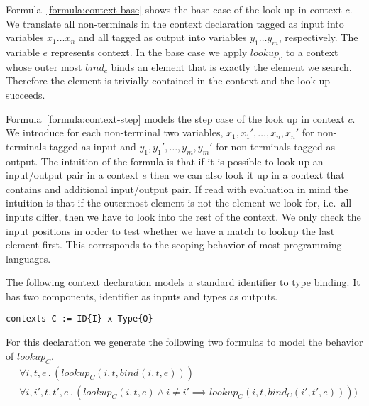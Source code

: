 Formula~\ref{formula:context-base} shows the base case of the look up
in context $c$. We translate all non-terminals in the context
declaration tagged as input into variables $x_1 \dots x_n$ and all
tagged as output into variables $y_1 \dots y_m$, respectively. The
variable $e$ represents context. In the base case we apply $lookup_c$
to a context whose outer most $bind_c$ binds an element that is
exactly the element we search. Therefore the element is trivially
contained in the context and the look up succeeds.

Formula~\ref{formula:context-step} models the step case of the look up
in context $c$. We introduce for each non-terminal two variables,
$x_1,x_1', \dots, x_n,x_n'$ for non-terminals tagged as input and
$y_1,y_1', \dots, y_m,y_m'$ for non-terminals tagged as output. The
intuition of the formula is that if it is possible to look up an
input/output pair in a context $e$ then we can also look it up in a
context that contains and additional input/output pair. If read with
evaluation in mind the intuition is that if the outermost element is
not the element we look for, i.e.\ all inputs differ, then we have to
look into the rest of the context. We only check the input positions
in order to test whether we have a match to lookup the last element
first. This corresponds to the scoping behavior of most programming
languages.

\begin{example}
  The following context declaration models a standard identifier to
  type binding. It has two components, identifier as inputs and types
  as outputs.
\begin{lstlisting}[language=sltc]
contexts C := ID{I} x Type{O}
\end{lstlisting}
  For this declaration we generate the following two formulas to model
  the behavior of $lookup_{C}$.
  \begin{align}
    &\forall i, t, e \,.\, (lookup_{C}(i, t, bind_{}(i, t,
    e))) \\
    &\forall i,i',t,t',e \,.\, (lookup_{C}(i, t, e) \land i \neq
    i' \implies lookup_{C}(i, t, bind_{C}(i', t', e))))
  \end{align}
\label{ex:context-formulas}
\end{example}


